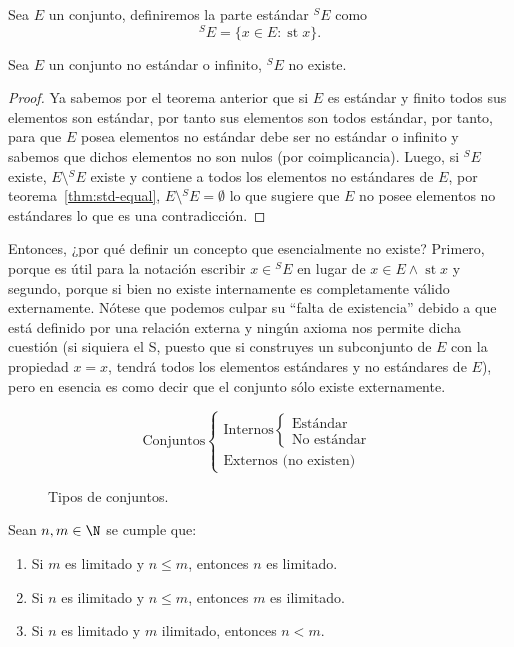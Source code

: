 \documentclass[11pt,oneside,a4paper]{book}
\DeclareMathOperator{\st}{st}
\begin{document}
\begin{mydef}
Sea $E$ un conjunto, definiremos la parte estándar $^SE$ como
$$^SE=\{x\in E:\st x\}.$$
\end{mydef}
\begin{thm}
Sea $E$ un conjunto no estándar o infinito, $^SE$ no existe.
\end{thm}
\begin{proof}
Ya sabemos por el teorema anterior que si $E$ es estándar y finito todos sus elementos son estándar, por tanto sus elementos son todos estándar, por tanto, para que $E$ posea elementos no estándar debe ser no estándar o infinito y sabemos que dichos elementos no son nulos (por coimplicancia). Luego, si $^SE$ existe, $E\setminus{^SE}$ existe y contiene a todos los elementos no estándares de $E$, por teorema~\ref{thm:std-equal}, $E\setminus{^SE}=\emptyset$ lo que sugiere que $E$ no posee elementos no estándares lo que es una contradicción.
\end{proof}
Entonces, ¿por qué definir un concepto que esencialmente no existe? Primero, porque es útil para la notación escribir $x\in {^SE}$ en lugar de $x\in E\wedge\st x$ y segundo, porque si bien no existe internamente es completamente válido externamente. Nótese que podemos culpar su ``falta de existencia'' debido a que está definido por una relación externa y ningún axioma nos permite dicha cuestión (si siquiera el S, puesto que si construyes un subconjunto de $E$ con la propiedad $x=x$, tendrá todos los elementos estándares y no estándares de $E$), pero en esencia es como decir que el conjunto sólo existe externamente.
\begin{figure}
$$\text{Conjuntos}
\begin{cases}
\text{Internos} \begin{cases}
\text{Estándar}\\
\text{No estándar}
\end{cases}\\
\text{Externos (no existen)}
\end{cases}$$
\caption{Tipos de conjuntos.}
\end{figure}
\begin{thm}
Sean $n,m\in\N$ se cumple que:
\begin{enumerate}[$a$)]
\item Si $m$ es limitado y $n\leq m$, entonces $n$ es limitado.
\item Si $n$ es ilimitado y $n\leq m$, entonces $m$ es ilimitado.
\item Si $n$ es limitado y $m$ ilimitado, entonces $n\lt m$.
\end{enumerate}
\end{thm}
\end{document}
